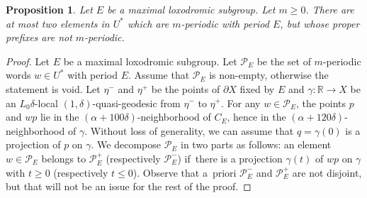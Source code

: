 \documentclass[11pt]{article}
\let\mathcal\mathscr
\theoremstyle{plain}
\newtheorem{prop}[thm]{Proposition}
\theoremstyle{definition}
\begin{document}
\begin{prop}
\label{L: construction semi-group power sensitive}
Let $E$ be a maximal loxodromic subgroup.
Let $m \geq 0$.
There are at most two elements in $U^*$ which are $m$-periodic with period $E$, but whose proper prefixes are not $m$-periodic.
\end{prop}

\begin{proof} Let $E$ be a maximal loxodromic subgroup.
Let $\mathcal P_E$ be the set of $m$-periodic words $w \in U^*$ with period $E$.
Assume that $\mathcal P_E$ is non-empty, otherwise the statement is void.
Let $\eta^-$ and $\eta^+$ be the points of $\partial X$ fixed by $E$ and $\gamma \colon \mathbb R \to X$ be an $L_0\delta$-local $(1, \delta)$-quasi-geodesic from $\eta^-$ to $\eta^+$.
For any $w \in \mathcal P_E$, the points $p$ and $wp$ lie in the $(\alpha + 100\delta)$-neighborhood of $C_E$, hence in the $(\alpha + 120\delta)$-neighborhood of $\gamma$.
Without loss of generality, we can assume that $q = \gamma(0)$ is a projection of $p$ on $\gamma$.
We decompose $\mathcal P_E$ in two parts as follows: an element $w \in \mathcal P_E$ belongs to $\mathcal P_E^+$ (respectively $\mathcal P_E^-$) if~there is a projection $\gamma(t)$ of $wp$ on $\gamma$ with $t \geq 0$ (respectively $t \leq 0$).
Observe that a~priori $\mathcal P_E^-$ and $\mathcal P_E^+$ are not disjoint, but that will not be an issue for the rest of the proof.


\end{proof}
\end{document}
